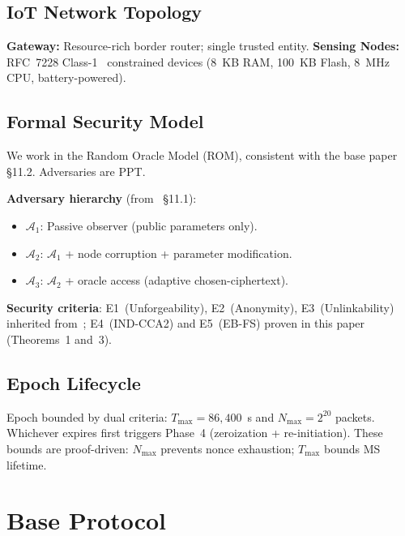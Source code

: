 \documentclass[conference]{IEEEtran}
\newcommand{\Nmax}{N_{\max}}
\newcommand{\Tmax}{T_{\max}}
\begin{document}
\subsection{IoT Network Topology}

\textbf{Gateway:} Resource-rich border router; single trusted entity.
\textbf{Sensing Nodes:} RFC~7228 Class-1~\cite{rfc7228} constrained
devices (8~KB RAM, 100~KB Flash, 8~MHz CPU, battery-powered).

\subsection{Formal Security Model}

We work in the Random Oracle Model (ROM), consistent with the base
paper~\cite{kumari2022} \S11.2. Adversaries are PPT.

\textbf{Adversary hierarchy} (from~\cite{kumari2022} \S11.1):
\begin{itemize}
  \item $\mathcal{A}_1$: Passive observer (public parameters only).
  \item $\mathcal{A}_2$: $\mathcal{A}_1$ + node corruption + parameter modification.
  \item $\mathcal{A}_3$: $\mathcal{A}_2$ + oracle access (adaptive chosen-ciphertext).
\end{itemize}

\textbf{Security criteria}: E1~(Unforgeability), E2~(Anonymity),
E3~(Unlinkability) inherited from~\cite{kumari2022}; E4~(IND-CCA2)
and E5~(EB-FS) proven in this paper (Theorems~1 and~3).

\subsection{Epoch Lifecycle}

Epoch bounded by dual criteria: $\Tmax = 86{,}400$~s and
$\Nmax = 2^{20}$ packets. Whichever expires first triggers Phase~4
(zeroization + re-initiation). These bounds are proof-driven:
$\Nmax$ prevents nonce exhaustion; $\Tmax$ bounds MS lifetime.

\section{Base Protocol}
\label{sec:base}
\end{document}
